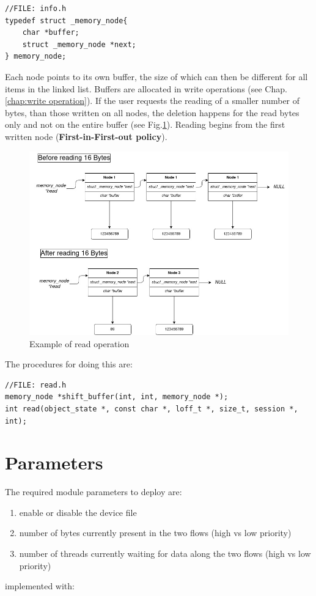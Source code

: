 \documentclass[12pt]{report}
\begin{document}
\begin{lstlisting}
//FILE: info.h
typedef struct _memory_node{
	char *buffer;
	struct _memory_node *next;
} memory_node;
\end{lstlisting}

Each node points to its own buffer, the size of which can then be different for all items in the linked list. Buffers are allocated in write operations (see Chap.\ref{chap:write operation}). If the user requests the reading of a smaller number of bytes, than those written on all nodes, the deletion happens for the read bytes only and not on the entire buffer (see Fig.\ref{fig:read}). Reading begins from the first written node (\textbf{First-in-First-out policy}). 

\begin{figure}[h]
	\centering
	\includegraphics[scale = .45]{read.jpg}
	\caption{Example of read operation}
	\label{fig:read}
\end{figure}

The procedures for doing this are:

\begin{lstlisting}
//FILE: read.h
memory_node *shift_buffer(int, int, memory_node *);
int read(object_state *, const char *, loff_t *, size_t, session *, int);
\end{lstlisting}

\chapter{Parameters}

The required module parameters to deploy are:

\begin{enumerate}
	\item enable or disable the device file
	\item number of bytes currently present in the two flows (high vs low priority)
	\item number of threads currently waiting for data along the two flows (high vs low priority)
\end{enumerate}
implemented with:
\end{document}
